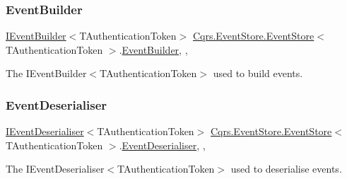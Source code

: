 \subsubsection{\texorpdfstring{Event\+Builder}{EventBuilder}}
{\footnotesize\ttfamily \hyperlink{interfaceCqrs_1_1EventStore_1_1IEventBuilder}{I\+Event\+Builder}$<$T\+Authentication\+Token$>$ \hyperlink{classCqrs_1_1EventStore_1_1EventStore}{Cqrs.\+Event\+Store.\+Event\+Store}$<$ T\+Authentication\+Token $>$.\hyperlink{classCqrs_1_1Events_1_1EventBuilder}{Event\+Builder}\hspace{0.3cm}{\ttfamily [get]}, {\ttfamily [set]}, {\ttfamily [protected]}}



The I\+Event\+Builder$<$\+T\+Authentication\+Token$>$ used to build events. 

\mbox{\label{classCqrs_1_1EventStore_1_1EventStore_a2b9140681d6bd25afb3a842e4cbf37cf_a2b9140681d6bd25afb3a842e4cbf37cf}} 
\subsubsection{\texorpdfstring{Event\+Deserialiser}{EventDeserialiser}}
{\footnotesize\ttfamily \hyperlink{interfaceCqrs_1_1EventStore_1_1IEventDeserialiser}{I\+Event\+Deserialiser}$<$T\+Authentication\+Token$>$ \hyperlink{classCqrs_1_1EventStore_1_1EventStore}{Cqrs.\+Event\+Store.\+Event\+Store}$<$ T\+Authentication\+Token $>$.\hyperlink{classCqrs_1_1Events_1_1EventDeserialiser}{Event\+Deserialiser}\hspace{0.3cm}{\ttfamily [get]}, {\ttfamily [set]}, {\ttfamily [protected]}}



The I\+Event\+Deserialiser$<$\+T\+Authentication\+Token$>$ used to deserialise events. 

\mbox{\label{classCqrs_1_1EventStore_1_1EventStore_ab1184aea49c7b0009a8f27d38f585952_ab1184aea49c7b0009a8f27d38f585952}} 
